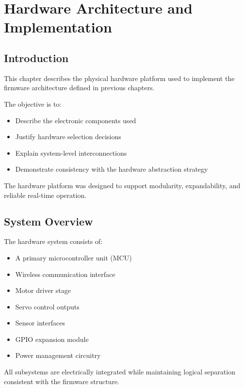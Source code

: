 \chapter{Hardware Architecture and Implementation}

\section{Introduction}

This chapter describes the physical hardware platform used to implement the firmware architecture defined in previous chapters. 

The objective is to:

\begin{itemize}
	\item Describe the electronic components used
	\item Justify hardware selection decisions
	\item Explain system-level interconnections
	\item Demonstrate consistency with the hardware abstraction strategy
\end{itemize}

The hardware platform was designed to support modularity, expandability, and reliable real-time operation.


\section{System Overview}

The hardware system consists of:

\begin{itemize}
	\item A primary microcontroller unit (MCU)
	\item Wireless communication interface
	\item Motor driver stage
	\item Servo control outputs
	\item Sensor interfaces
	\item GPIO expansion module
	\item Power management circuitry
\end{itemize}

All subsystems are electrically integrated while maintaining logical separation consistent with the firmware structure.


